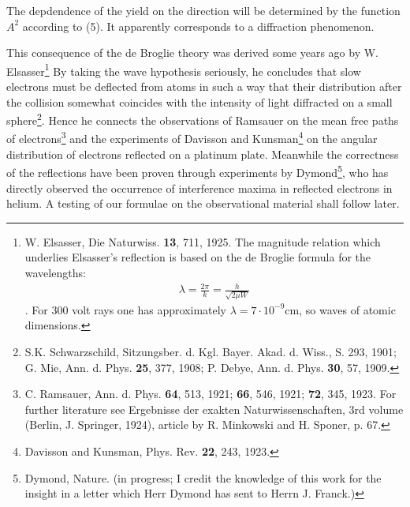 \documentclass[a4paper,11pt]{article}
\newcommand{\textbb}[1]{\textbf{#1}}
\newcommand{\?}[2]{#1\footnote{\textsc{Translator note}: #2}}
\newcommand{\uequ}[1]{\begin{align*}#1\end{align*}}
\begin{document}
The depdendence of the yield on the direction will be determined by the function $A^2$ according to (5). It apparently corresponds to a diffraction phenomenon.

This consequence of the de Broglie theory was derived some years ago by W. Elsasser\footnote{W. Elsasser, Die Naturwiss. \textbb{13}, 711, 1925. The magnitude relation which underlies Elsasser's reflection is based on the de Broglie formula for the wavelengths: \uequ{\lambda = \frac{2\pi}{k} = \frac{h}{\sqrt{2\mu W}}}. For 300 volt rays one has approximately $\lambda = 7\cdot 10^{-9}\text{cm}$, so waves of atomic dimensions.} By taking the wave hypothesis seriously, he concludes that slow electrons must be deflected from atoms in such a way that their distribution after the collision somewhat coincides with the intensity of light diffracted on a small sphere\footnote{S.K. Schwarzschild, Sitzungsber. d. Kgl. Bayer. Akad. d. Wiss., S. 293, 1901; G. Mie, Ann. d. Phys. \textbb{25}, 377, 1908; P. Debye, Ann. d. Phys. \textbb{30}, 57, 1909.}. Hence he connects the observations of Ramsauer on the mean free paths of electrons\footnote{C. Ramsauer, Ann. d. Phys. \textbb{64}, 513, 1921; \textbb{66}, 546, 1921; \textbb{72}, 345, 1923. For further literature see Ergebnisse der exakten Naturwissenschaften, 3rd volume (Berlin, J. Springer, 1924), article by R. Minkowski and H. Sponer, p. 67.} and the experiments of Davisson and Kunsman\footnote{Davisson and Kunsman, Phys. Rev. \textbb{22}, 243, 1923.} on the angular distribution of electrons reflected on a platinum plate. Meanwhile the correctness of the reflections have been proven through experiments by Dymond\footnote{Dymond, Nature. (in progress; I credit the knowledge of this work for the insight in a letter which Herr Dymond has sent to Herrn J. Franck.)}, who has directly observed the occurrence of interference maxima in reflected electrons in helium. A testing of our formulae on the observational material shall follow later.
\end{document}
